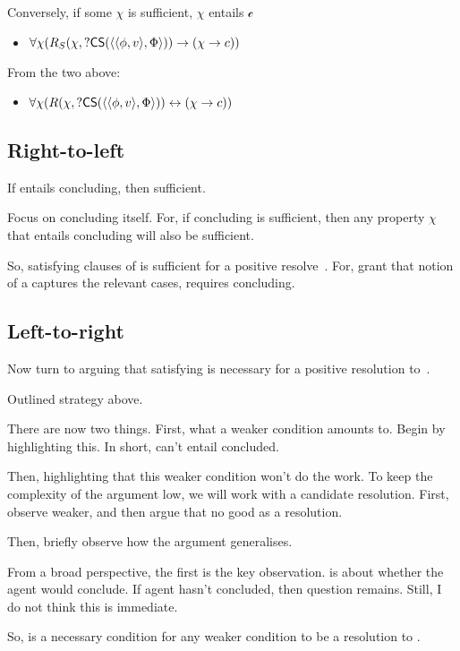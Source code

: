 \begin{note}
{    Conversely, if some \(\chi\) is sufficient, \(\chi\) entails \(\mathcal{c}\)

    \begin{itemize}
    \item \(\forall \chi(R_{S}(\chi,?\mathsf{CS}(\langle \langle \phi, v \rangle, \Phi \rangle)) \rightarrow (\chi \rightarrow c))\)
    \end{itemize}

    From the two above:
    \begin{itemize}
    \item \(\forall \chi(R(\chi,?\mathsf{CS}(\langle \langle \phi, v \rangle, \Phi \rangle)) \leftrightarrow (\chi \rightarrow c))\)
    \end{itemize}
  }
\end{note}


\subsection{Right-to-left}

\begin{note}
  If entails concluding, then sufficient.

  Focus on concluding itself.
  For, if concluding is sufficient, then any property \(\chi\) that entails concluding will also be sufficient.

  So, satisfying clauses of \iCS{} is sufficient for a positive resolve~\qzs{}.
  For, grant that notion of a  captures the relevant cases, \iCS{} requires concluding.
\end{note}

\subsection{Left-to-right}

\begin{note}
  Now turn to arguing that satisfying \iCS{} is necessary for a positive resolution to~\qzs{}.

  Outlined strategy above.

  There are now two things.
  First, what a weaker condition amounts to.
  Begin by highlighting this.
  In short, can't entail concluded.

  Then, highlighting that this weaker condition won't do the work.
  To keep the complexity of the argument low, we will work with a candidate resolution.
  First, observe weaker, and then argue that no good as a resolution.

  Then, briefly observe how the argument generalises.

  From a broad perspective, the first is the key observation.
  \qzs{} is about whether the agent would conclude.
  If agent hasn't concluded, then question remains.
  Still, I do not think this is immediate.

  So, \iCS{} is a necessary condition for any weaker condition to be a resolution to \qzs{}.
\end{note}


